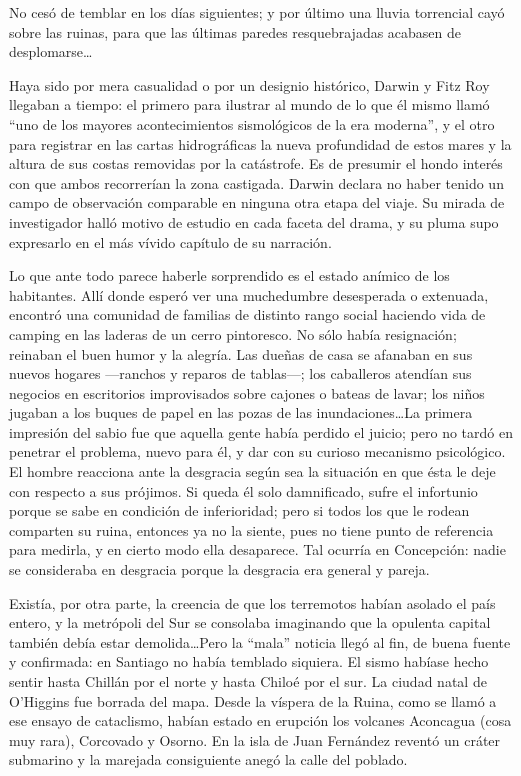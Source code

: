 \documentclass[10pt,twoside,openright]{memoir}
\begin{document}
No cesó de temblar en los días siguientes; y por último una lluvia
torrencial cayó sobre las ruinas, para que las últimas paredes
resquebrajadas acabasen de desplomarse\ldots

Haya sido por mera casualidad o por un designio histórico, Darwin y Fitz
Roy llegaban a tiempo: el primero para ilustrar al mundo de lo que él
mismo llamó ``uno de los mayores acontecimientos sismológicos de la era
moderna'', y el otro para registrar en las cartas hidrográficas la nueva
profundidad de estos mares y la altura de sus costas removidas por la
catástrofe. Es de presumir el hondo interés con que ambos recorrerían la
zona castigada. Darwin declara no haber tenido un campo de observación
comparable en ninguna otra etapa del viaje. Su mirada de investigador
halló motivo de estudio en cada faceta del drama, y su pluma supo
expresarlo en el más vívido capítulo de su narración.

Lo que ante todo parece haberle sorprendido es el estado anímico de los
habitantes. Allí donde esperó ver una muchedumbre desesperada o
extenuada, encontró una comunidad de familias de distinto rango social
haciendo vida de camping en las laderas de un cerro pintoresco. No sólo
había resignación; reinaban el buen humor y la alegría. Las dueñas de
casa se afanaban en sus nuevos hogares ---ranchos y reparos de
tablas---; los caballeros atendían sus negocios en escritorios
improvisados sobre cajones o bateas de lavar; los niños jugaban a los
buques de papel en las pozas de las inundaciones\ldots La primera impresión
del sabio fue que aquella gente había perdido el juicio; pero no tardó
en penetrar el problema, nuevo para él, y dar con su curioso mecanismo
psicológico. El hombre reacciona ante la desgracia según sea la
situación en que ésta le deje con respecto a sus prójimos. Si queda él
solo damnificado, sufre el infortunio porque se sabe en condición de
inferioridad; pero si todos los que le rodean comparten su ruina,
entonces ya no la siente, pues no tiene punto de referencia para
medirla, y en cierto modo ella desaparece. Tal ocurría en Concepción:
nadie se consideraba en desgracia porque la desgracia era general y
pareja.

Existía, por otra parte, la creencia de que los terremotos habían
asolado el país entero, y la metrópoli del Sur se consolaba imaginando
que la opulenta capital también debía estar demolida\ldots Pero la ``mala''
noticia llegó al fin, de buena fuente y confirmada: en Santiago no había
temblado siquiera. El sismo habíase hecho sentir hasta Chillán por el
norte y hasta Chiloé por el sur. La ciudad natal de O'Higgins fue
borrada del mapa. Desde la víspera de la Ruina, como se llamó a ese
ensayo de cataclismo, habían estado en erupción los volcanes Aconcagua
(cosa muy rara), Corcovado y Osorno. En la isla de Juan Fernández
reventó un cráter submarino y la marejada consiguiente anegó la calle
del poblado.
\end{document}
